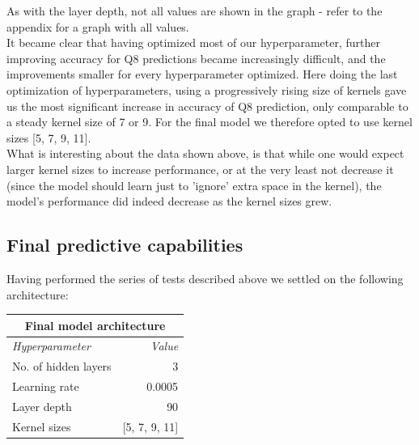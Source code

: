 \noindent As with the layer depth, not all values are shown in the graph - refer to the appendix for a graph with all values.\\
It became clear that having optimized most of our hyperparameter, further improving accuracy for Q8 predictions became increasingly difficult, and the improvements smaller for every hyperparameter optimized. Here doing the last optimization of hyperparameters, using a progressively rising size of kernels gave us the most significant increase in accuracy of Q8 prediction, only comparable to a steady kernel size of 7 or 9. For the final model we therefore opted to use kernel sizes [5, 7, 9, 11].\\
What is interesting about the data shown above, is that while one would expect larger kernel sizes to increase performance, or at the very least not decrease it (since the model should learn just to 'ignore' extra space in the kernel), the model's performance did indeed decrease as the kernel sizes grew.



\subsection{Final predictive capabilities}
Having performed the series of tests described above we settled on the following architecture:
\begin{table}[H]
\centering
\begin{tabular}{lr}
\multicolumn{2}{c}{\textbf{Final model architecture}} \\ \hline
\multicolumn{1}{l|}{\textit{Hyperparameter}} & \textit{Value} \\ \hline
\multicolumn{1}{l|}{No. of hidden layers} & 3 \\
\multicolumn{1}{l|}{Learning rate} & 0.0005 \\
\multicolumn{1}{l|}{Layer depth} & 90 \\
\multicolumn{1}{l|}{Kernel sizes} & {[}5, 7, 9, 11{]}
\end{tabular}
\end{table}

